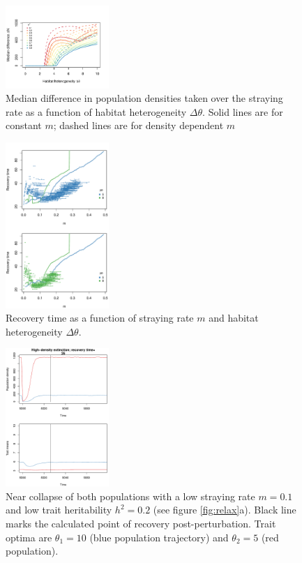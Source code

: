 \documentclass[twocolumn,preprintnumbers,amsmath,amssymb,superscriptaddress]{revtex4}
\begin{document}
\begin{figure}
  \captionsetup{justification=raggedright,
singlelinecheck=false
}
\centering
\includegraphics[width=0.35\textwidth]{figs2/fig_thetadiffN.pdf}
\caption{
Median difference in population densities taken over the straying rate as a function of habitat heterogeneity $\Delta\theta$.
Solid lines are for constant $m$; dashed lines are for density dependent $m$} \label{fig:thetadiffN}
\end{figure}



\begin{figure}
  \captionsetup{justification=raggedright,
singlelinecheck=false
}
\centering
\includegraphics[width=0.35\textwidth]{figs2/fig_relaxtheta.pdf}
\caption{
Recovery time as a function of straying rate $m$ and habitat heterogeneity $\Delta\theta$.
} \label{fig:relaxtheta}
\end{figure}

\begin{figure}
  \captionsetup{justification=raggedright,
singlelinecheck=false
}
\centering
\includegraphics[width=0.35\textwidth]{figs2/fig_relax_both_lowh.pdf}
\caption{
Near collapse of both populations with a low straying rate $m=0.1$ and low trait heritability $h^2=0.2$ (see figure \ref{fig:relax}a).
Black line marks the calculated point of recovery post-perturbation.
Trait optima are $\theta_1 = 10$ (blue population trajectory) and $\theta_2 = 5$ (red population).
} \label{fig:relaxtraj_bothlh}
\end{figure}
\end{document}
